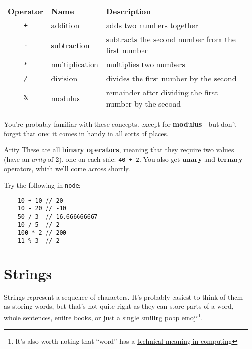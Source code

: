 \begin{small}
    \begin{tabularx}{\textwidth}{c l l}
        \textbf{Operator} & \textbf{Name} & \textbf{Description} \\
        \texttt{+}  & addition        & adds two numbers together \\
        \texttt{-}  & subtraction     & subtracts the second number from the first number \\
        \texttt{*}  & multiplication  & multiplies two numbers \\
        \texttt{/}  & division        & divides the first number by the second \\
        \texttt{\%} & modulus         & remainder after dividing the first number by the second
    \end{tabularx}
\end{small}

\par\bigskip

You're probably familiar with these concepts, except for \textbf{modulus} - but don't forget that one: it comes in handy in all sorts of places.

\begin{infobox}{Arity}
    These are all \textbf{binary operators}, meaning that they require two values (have an \textit{arity} of 2), one on each side: \texttt{40 + 2}. You also get \textbf{unary} and \textbf{ternary} operators, which we'll come across shortly.
\end{infobox}

\pagebreak

Try the following in \texttt{node}:

\begin{verbatim}
    10 + 10 // 20
    10 - 20 // -10
    50 / 3  // 16.666666667
    10 / 5  // 2
    100 * 2 // 200
    11 % 3  // 2
\end{verbatim}


\section{Strings}

Strings represent a sequence of characters. It's probably easiest to think of them as storing words, but that's not quite right as they can store parts of a word, whole sentences, entire books, or just a single smiling poop emoji\footnote{It's also worth noting that ``word'' has a \href{https://en.wikipedia.org/wiki/Word_(computer_architecture)}{technical meaning in computing}}.
\\

